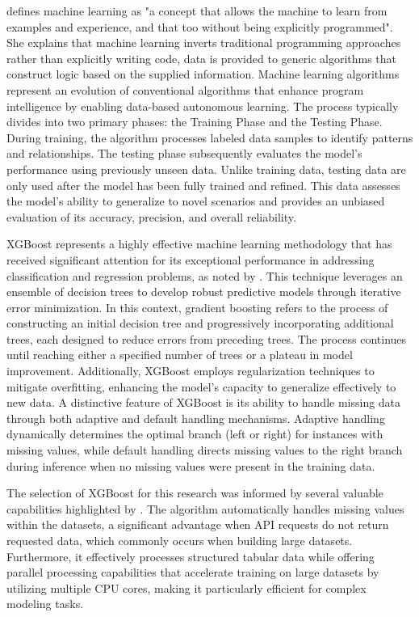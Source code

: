 \textcite{Johari2018MachineExamples} defines machine learning as "a concept that allows the machine to learn from examples and experience, and that too without being explicitly programmed". She explains that machine learning inverts traditional programming approaches rather than explicitly writing code, data is provided to generic algorithms that construct logic based on the supplied information. Machine learning algorithms represent an evolution of conventional algorithms that enhance program intelligence by enabling data-based autonomous learning. The process typically divides into two primary phases: the Training Phase and the Testing Phase. During training, the algorithm processes labeled data samples to identify patterns and relationships. The testing phase subsequently evaluates the model's performance using previously unseen data. Unlike training data, testing data are only used after the model has been fully trained and refined. This data assesses the model's ability to generalize to novel scenarios and provides an unbiased evaluation of its accuracy, precision, and overall reliability.

XGBoost represents a highly effective machine learning methodology that has received significant attention for its exceptional performance in addressing classification and regression problems, as noted by \textcite{Harrison2023EffectiveModels}. This technique leverages an ensemble of decision trees to develop robust predictive models through iterative error minimization. In this context, gradient boosting refers to the process of constructing an initial decision tree and progressively incorporating additional trees, each designed to reduce errors from preceding trees. The process continues until reaching either a specified number of trees or a plateau in model improvement. Additionally, XGBoost employs regularization techniques to mitigate overfitting, enhancing the model's capacity to generalize effectively to new data. A distinctive feature of XGBoost is its ability to handle missing data through both adaptive and default handling mechanisms. Adaptive handling dynamically determines the optimal branch (left or right) for instances with missing values, while default handling directs missing values to the right branch during inference when no missing values were present in the training data.

The selection of XGBoost for this research was informed by several valuable capabilities highlighted by \textcite{Harrison2023EffectiveModels}. The algorithm automatically handles missing values within the datasets, a significant advantage when API requests do not return requested data, which commonly occurs when building large datasets. Furthermore, it effectively processes structured tabular data while offering parallel processing capabilities that accelerate training on large datasets by utilizing multiple CPU cores, making it particularly efficient for complex modeling tasks.